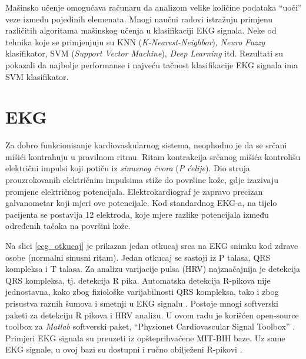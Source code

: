 \documentclass[12pt]{SeminarskiADS}
\begin{document}
Mašinsko učenje omogućava računaru da analizom velike količine podataka ``uoči'' veze između pojedinih elemenata. Mnogi naučni radovi istražuju primjenu različitih algoritama mašinskog učenja u klasifikaciji EKG signala. Neke od tehnika koje se primjenjuju su KNN (\emph{K-Nearest-Neighbor}), \emph{Neuro Fuzzy} klasifikator, SVM (\emph{Support Vector Machine}), \emph{Deep Learning} itd. Rezultati su pokazali da najbolje performanse i najveću tačnost klasifikacije EKG signala ima SVM klasifikator. 


\section{EKG}

Za dobro funkcionisanje kardiovaskularnog sistema, neophodno je da se srčani mišići kontrahuju u pravilnom ritmu. Ritam kontrakcija srčanog mišića kontrolišu električni impulsi koji potiču iz \emph{sinusnog čvora} (\emph{P ćelije}). Dio struja prouzrokovanih električnim impulsima stiže do površine kože, gdje izazivaju promjene električnog potencijala. Elektrokardiograf je zapravo precizan galvanometar koji mjeri ove potencijale. Kod standardnog EKG-a, na tijelo pacijenta se postavlja 12 elektroda, koje mjere razlike potencijala između određenih tačaka na površini kože.

Na slici \ref{ecg_otkucaj} je prikazan jedan otkucaj srca na EKG snimku kod zdrave osobe (normalni sinusni ritam). Jedan otkucaj se sastoji iz P talasa, QRS kompleksa i T talasa. Za analizu varijacije pulsa (HRV) najznačajnija je detekcija QRS kompleksa, tj. detekcija R pika. Automatska detekcija R-pikova nije jednostavna, kako zbog fiziološke varijabilnosti QRS kompleksa, tako i zbog prisustva raznih šumova i smetnji u EKG signalu \cite{rpeak_dwt}. Postoje mnogi softverski paketi za detekciju R pikova i HRV analizu. U ovom radu je korišćen open-source toolbox za \emph{Matlab} softverski paket, ``Physionet Cardiovascular Signal Toolbox'' \cite{physionet_tbx}. Primjeri EKG signala su preuzeti iz opšteprihvaćene MIT-BIH baze. Uz same EKG signale, u ovoj bazi su dostupni i ručno obilježeni R-pikovi \cite{mit_bih}. %
\end{document}
